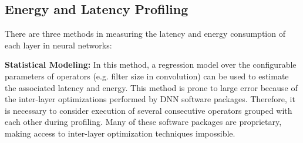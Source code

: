 


\subsection{Energy and Latency Profiling}
\label{energy_latency_profiling}
There are three methods in measuring the latency and energy consumption of each layer in neural networks: 

\textbf{Statistical Modeling:} In this method, a regression model over the configurable parameters of operators (e.g. filter size in convolution) can be used to estimate the associated latency and energy. This method is prone to large error because of the inter-layer optimizations performed by DNN software packages. Therefore, it is necessary to consider execution of several consecutive operators grouped with each other during profiling. Many of these software packages are proprietary, making access to inter-layer optimization techniques impossible. 

